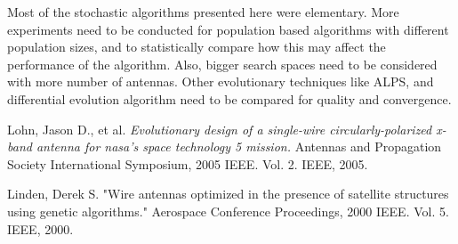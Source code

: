 \documentclass[conference]{IEEEtran}
\begin{document}
Most of the stochastic algorithms presented here were elementary. More experiments need to be conducted for population based algorithms with different population sizes, and to statistically compare how this may affect the performance of the algorithm. Also, bigger search spaces need to be considered with more number of antennas. Other evolutionary techniques like ALPS, and differential evolution algorithm need to be compared for quality and convergence.

\begin{thebibliography}{1}

Lohn, Jason D., et al. \emph{Evolutionary design of a single-wire circularly-polarized x-band antenna for nasa's space technology 5 mission.} Antennas and Propagation Society International Symposium, 2005 IEEE. Vol. 2. IEEE, 2005.

Linden, Derek S. "Wire antennas optimized in the presence of satellite structures using genetic algorithms." Aerospace Conference Proceedings, 2000 IEEE. Vol. 5. IEEE, 2000.
\end{thebibliography}
\end{document}
